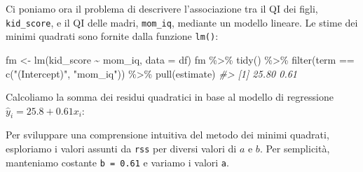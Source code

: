 \documentclass[
  11pt,
]{krantz}
\makeatletter
\newenvironment{Shaded}{\begin{snugshade}}{\end{snugshade}}
\newcommand{\AttributeTok}[1]{\textcolor[rgb]{0.61,0.61,0.61}{#1}}
\newcommand{\CommentTok}[1]{\textcolor[rgb]{0.37,0.37,0.37}{\textit{#1}}}
\newcommand{\DecValTok}[1]{\textcolor[rgb]{0.06,0.06,0.06}{#1}}
\newcommand{\FloatTok}[1]{\textcolor[rgb]{0.06,0.06,0.06}{#1}}
\newcommand{\FunctionTok}[1]{\textcolor[rgb]{0,0,0}{#1}}
\newcommand{\NormalTok}[1]{#1}
\newcommand{\OtherTok}[1]{\textcolor[rgb]{0.37,0.37,0.37}{#1}}
\newcommand{\SpecialCharTok}[1]{\textcolor[rgb]{0,0,0}{#1}}
\newcommand{\StringTok}[1]{\textcolor[rgb]{0.5,0.5,0.5}{#1}}
\newenvironment{kframe}{%
\medskip{}
\setlength{\fboxsep}{.8em}
 \def\at@end@of@kframe{}%
 \ifinner\ifhmode%
  \def\at@end@of@kframe{\end{minipage}}%
  \begin{minipage}{\columnwidth}%
 \fi\fi%
 \def\FrameCommand##1{\hskip\@totalleftmargin \hskip-\fboxsep
 \colorbox{shadecolor}{##1}\hskip-\fboxsep
     \hskip-\linewidth \hskip-\@totalleftmargin \hskip\columnwidth}%
 \MakeFramed {\advance\hsize-\width
   \@totalleftmargin\z@ \linewidth\hsize
   \@setminipage}}%
 {\par\unskip\endMakeFramed%
 \at@end@of@kframe}
\renewenvironment{Shaded}{\begin{kframe}}{\end{kframe}}
\theoremstyle{definition}
\theoremstyle{definition}
\theoremstyle{definition}
\theoremstyle{definition}
\theoremstyle{remark}
\makeatother
\begin{document}
Ci poniamo ora il problema di descrivere l'associazione tra il QI dei figli, \texttt{kid\_score}, e il QI delle madri, \texttt{mom\_iq}, mediante un modello lineare. Le stime dei minimi quadrati sono fornite dalla funzione \texttt{lm()}:

\begin{Shaded}
\begin{Highlighting}[]
\NormalTok{fm }\OtherTok{\textless{}{-}} \FunctionTok{lm}\NormalTok{(kid\_score }\SpecialCharTok{\textasciitilde{}}\NormalTok{ mom\_iq, }\AttributeTok{data =}\NormalTok{ df)}
\NormalTok{fm }\SpecialCharTok{\%\textgreater{}\%}
  \FunctionTok{tidy}\NormalTok{() }\SpecialCharTok{\%\textgreater{}\%} 
  \FunctionTok{filter}\NormalTok{(term }\SpecialCharTok{==} \FunctionTok{c}\NormalTok{(}\StringTok{"(Intercept)"}\NormalTok{, }\StringTok{"mom\_iq"}\NormalTok{)) }\SpecialCharTok{\%\textgreater{}\%} 
  \FunctionTok{pull}\NormalTok{(estimate)}
\CommentTok{\#\textgreater{} [1] 25.80  0.61}
\end{Highlighting}
\end{Shaded}

\noindent Calcoliamo la somma dei residui quadratici in base al modello di regressione \(\hat{y}_i = 25.8 + 0.61 x_i\):

\begin{Shaded}
\end{Shaded}

Per sviluppare una comprensione intuitiva del metodo dei minimi quadrati, esploriamo i valori assunti da \texttt{rss} per diversi valori di \(a\) e \(b\). Per semplicità, manteniamo costante \texttt{b\ =\ 0.61} e variamo i valori \texttt{a}.

\begin{Shaded}
\end{Shaded}
\end{document}
